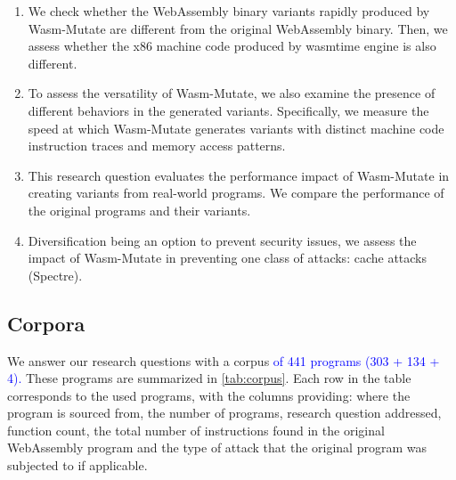 \documentclass[a4paper,fleqn]{cas-dc}
\newcommand{\tool}{{\sc Wasm-Mutate}\xspace}
\newcommand{\Wasm}{WebAssembly\xspace}
\newcommand{\wasm}{\Wasm}
\newenvironment{revision1}{\color{blue}}{}
\newcommand{\revision}[1]{\textcolor{blue}{#1}}
\begin{document}
\newcommand{\nProgramsRosetta}{303\xspace}


\newcommand{\DTWStatic}{\ensuremath{\mathit{dt\_static}\xspace}}
\newcommand{\DTWDynamic}{\ensuremath{\mathit{dt\_dy}\xspace}}

\begin{enumerate}[label=RQ\arabic*:, ref=RQ\arabic*]
     \item \label{rq:static} \textbf{\rqstatic}
        We check whether the \wasm binary variants rapidly produced by \tool are different from the original \wasm binary. Then, we assess whether the x86 machine code produced by wasmtime engine is also different.
    
    \item \label{rq:dynamic}\textbf{\rqdynamic}
    To assess the versatility of \tool, we also examine the presence of different behaviors in the generated variants. 
    Specifically, we measure the speed at which \tool generates variants with distinct machine code instruction traces and memory access patterns.
    
        

     \begin{revision1}
        \item \label{rq:performance}\textbf{\rqperformance} This research question evaluates the performance impact of \tool in creating variants from real-world programs. We compare the performance of the original programs and their variants.
     \end{revision1}
     
    \item \label{rq:defensive}\textbf{\rqdefensive} Diversification being an option to prevent security issues,  we assess the impact of \tool in preventing one class of attacks: cache attacks (Spectre).

        
\end{enumerate}


\subsection{Corpora}
\label{sec:corpus}



We answer our research questions with a corpus \revision{ of 441 programs (303 + 134 + 4).}
These programs are summarized in \autoref{tab:corpus}.
Each row in the table corresponds to the used programs, with the columns providing: where the program is sourced from, the number of programs, research question addressed, function count, the total number of instructions found in the original \wasm program and the type of attack that the original program was subjected to if applicable.
\end{document}
